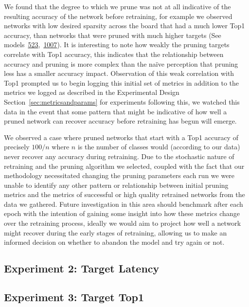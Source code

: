 \documentclass[../Dissertation.tex]{subfiles}
\begin{document}
We found that the degree to which we prune was not at all indicative of the resulting accuracy of the network before retraining, for example we observed networks with low desired sparsity across the board that had a much lower Top1 accuracy, than networks that were pruned with much higher targets (See models~\hyperref[sec:golden-sweep-523]{523},~\hyperref[sec:comfy-sweep-1007]{1007}).
It is interesting to note how weakly the pruning targets correlate with Top1 accuracy, this indicates that the relationship between accuracy and pruning is more complex than the naïve perception that pruning less has a smaller accuracy impact.
Observation of this weak correlation with Top1 prompted us to begin logging this initial set of metrics in addition to the metrics we logged as described in the Experimental Design Section~\ref{sec:metricsandparams} for experiments following this, we watched this data in the event that some pattern that might be indicative of how well a pruned network can recover accuracy before retraining has begun will emerge.

We observed a case where pruned networks that start with a Top1 accuracy of precisely $100 / n$ where $n$ is the number of classes would (according to our data) never recover any accuracy during retraining.
Due to the stochastic nature of retraining and the pruning algorithm we selected, coupled with the fact that our methodology necessitated changing the pruning parameters each run we were unable to identify any other pattern or relationship between initial pruning metrics and the metrics of successful or high quality retrained networks from the data we gathered. 
Future investigation in this area should benchmark after each epoch with the intention of gaining some insight into how these metrics change over the retraining process, ideally we would aim to project how well a network might recover during the early stages of retraining, allowing us to make an informed decision on whether to abandon the model and try again or not.


\subsection{Experiment 2: Target Latency}

\subsection{Experiment 3: Target Top1}
\end{document}
